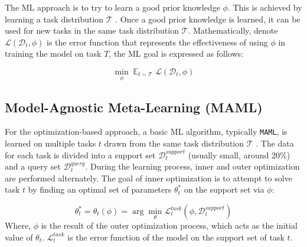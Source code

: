 The ML approach is to try to learn a good prior knowledge $\phi$. This is achieved by learning a task distribution $\mathcal{T}$ \cite{hospedales2021meta}. Once a good prior knowledge is learned, it can be used for new tasks in the same task distribution $\mathcal{T}$. Mathematically, denote $\mathcal{L}(\mathcal{D}_t, \phi)$ is the error function that represents the effectiveness of using $\phi$ in training the model on task $T$, the ML goal is expressed as follows:

\begin{equation}
    \min_{\phi} \mathop{\mathbb{E}}_{t\sim \mathcal{T}} \mathcal{L}(\mathcal{D}_t, \phi)
\end{equation}

\subsection{Model-Agnostic Meta-Learning (MAML)}


For the optimization-based approach, a basic ML algorithm, typically \verb|MAML|, is learned on multiple tasks $t$ drawn from the same task distribution $\mathcal{T}$ \cite{hospedales2021meta}. The data for each task is divided into a support set $\mathcal{D}_t^{support}$ (usually small, around 20\%) and a query set $\mathcal{D}_t^{query}$. During the learning process, inner and outer optimization are performed alternately. The goal of inner optimization is to attempt to solve task $t$ by finding an optimal set of parameters $\theta_t^*$ on the support set via $\phi$:

\begin{equation}
    \theta_t^* = \theta_t(\phi) = \arg\min_{\theta}{\mathcal{L}^{task}_t\left( \phi, \mathcal{D}_t^{support} \right)}
    \label{eq:inner_opt}
\end{equation} Where, $\phi$ is the result of the outer optimization process, which acts as the initial value of $\theta_t$. $\mathcal{L}^{task}_t$ is the error function of the model on the support set of task $t$.

